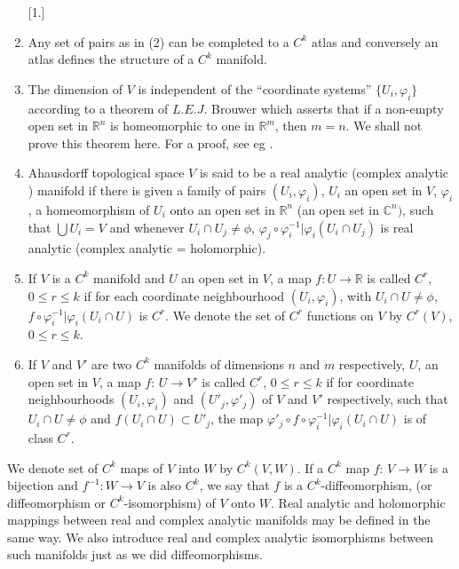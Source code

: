 \begin{remarks*}
  \begin{enumerate} [1.]
  \item Any set of pairs as in (2) can be completed to a $C^k$
    atlas and conversely an atlas defines the structure of a $C^k$
    manifold. 
  \item The dimension of $V$ is independent of the ``coordinate
    systems'' $\{U_i, \varphi_i\}$ according to a theorem of
    $L.E.J$. Brouwer which asserts that if a non-empty open set in
    $\mathbb{R}^n$ is homeomorphic to one in $\mathbb{R}^m$, then $m =
    n$. We shall not prove this theorem here. For a proof, see eg
    \cite{18}. 
  \item A\pageoriginale hausdorff topological space $V$ is said to be a real
    analytic (complex analytic ) manifold if there is given a family
    of pairs $(U_i, \varphi_i)$, $U_i$ an open set in $V$,
    $\varphi_i$, a homeomorphism of $U_i$ onto an open set in
    $\mathbb{R}^n$ (an open set in $\mathbb{C}^n)$, such that $\bigcup
    U_i = V$ and whenever $U_i \cap U_j \neq \phi$, $\varphi_j \circ
    \varphi^{-1}_i \big | \varphi_i (U_i \cap U_j)$ is real analytic
    (complex analytic = holomorphic). 
  \item If $V$ is a $C^k$ manifold and $U$ an open set in $V$, a map
    $f: U \to \mathbb{R}$ is called $C^r$, $0 \le r \le k$ if for
    each coordinate neighbourhood $(U_i, \varphi_i)$, with $U_i \cap U
    \neq \phi$, $f \circ \varphi^{-1}_i \big | \varphi_i (U_i \cap U)$ is
    $C^r$. We denote the set of $C^r $ functions on $V$ by $C^r (V)$,
    $0 \le r \le k$. 
  \item If $V$ and $V'$ are two $C^k$ manifolds of dimensions $n$ and
    $m$ respectively, $U$, an open set in $V$, a map $f$: $U \to V'$
    is called $C^r$, $0 \le r \le k$ if for coordinate neighbourhoods
    $(U_i, \varphi_i) $ and $(U'_j, \varphi'_j)$ of $V$ and $V'$
    respectively, such that $U_i \cap U \neq \phi$ and $f(U_i \cap U)
    \subset U'_j$, the map $\varphi'_j \circ f \circ \varphi^{-1}_i \big |
    \varphi_i (U_i \cap U)$ is of class $C^r$. 
  \end{enumerate}
\end{remarks*}

We denote set of $C^k$ maps of $V$ into $W$ by $C^k (V, W)$. If a
$C^k$ map $f$: $V \to W$ is a bijection and $f^{-1}: W \to V$ is
also $C^k$, we say that $f$ is a $C^k$-diffeomorphism, (or
diffeomorphism or $C^k$-isomorphism) of $V$ onto $W$. Real analytic
and holomorphic mappings between real and complex analytic manifolds
may be defined in the same way. We also introduce real and complex
analytic isomorphisms between such manifolds just as we did
diffeomorphisms. 

